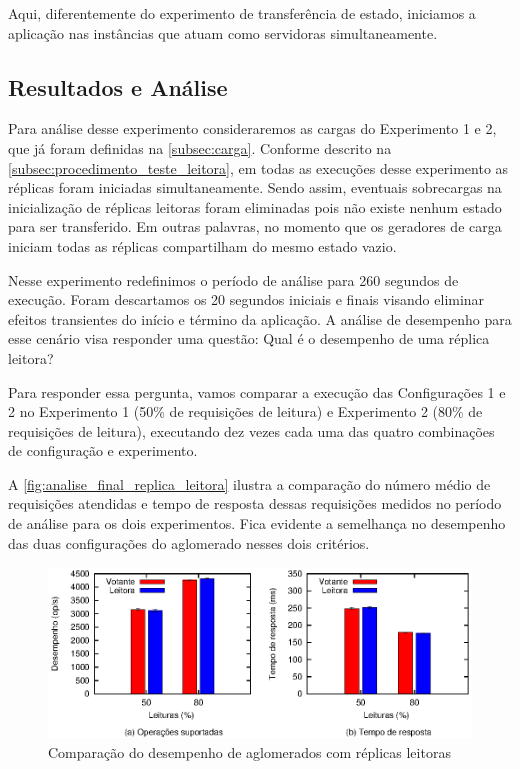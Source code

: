 Aqui, diferentemente do experimento de transferência de estado, iniciamos a aplicação nas
instâncias que atuam como servidoras simultaneamente.

\subsection{Resultados e Análise}

Para análise desse experimento consideraremos as cargas do Experimento 1 e 2, que já foram
definidas na \autoref{subsec:carga}. Conforme descrito na
\autoref{subsec:procedimento_teste_leitora}, em todas as execuções desse experimento as
réplicas foram iniciadas simultaneamente. Sendo assim, eventuais sobrecargas na
inicialização de réplicas leitoras foram eliminadas pois não existe nenhum estado para ser
transferido. Em outras palavras, no momento que os geradores de carga iniciam todas as
réplicas compartilham do mesmo estado vazio.

Nesse experimento redefinimos o período de análise para 260 segundos de execução. Foram
descartamos os 20 segundos iniciais e finais visando eliminar efeitos transientes do
início e término da aplicação. A análise de desempenho para esse cenário visa responder
uma questão: Qual é o desempenho de uma réplica leitora?

Para responder essa pergunta, vamos comparar a execução das Configurações 1 e 2 no
Experimento 1 (50\% de requisições de leitura) e Experimento 2 (80\% de requisições de
leitura), executando dez vezes cada uma das quatro combinações de configuração e
experimento.

A \autoref{fig:analise_final_replica_leitora} ilustra a comparação do número médio de
requisições atendidas e tempo de resposta dessas requisições medidos no período de análise
para os dois experimentos. Fica evidente a semelhança no desempenho das duas configurações
do aglomerado nesses dois critérios.

\begin{figure}[ht]
  \centering
  \includegraphics[width=14cm]{conteudo/capitulos/figuras/final-replica-leitora.eps}
  \caption{Comparação do desempenho de aglomerados com réplicas leitoras}
  \label{fig:analise_final_replica_leitora}
\end{figure}

